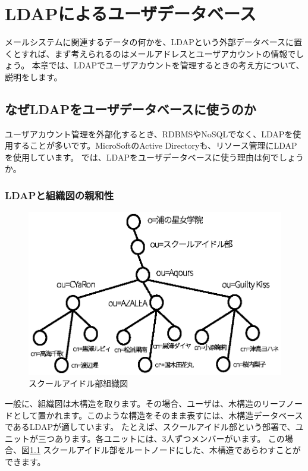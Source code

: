 \chapter{LDAPによるユーザデータベース}

メールシステムに関連するデータの何かを、LDAPという外部データベースに置くとすれば、まず考えられるのはメールアドレスとユーザアカウントの情報でしょう。
本章では、LDAPでユーザアカウントを管理するときの考え方について、説明をします。

\section{なぜLDAPをユーザデータベースに使うのか}

ユーザアカウント管理を外部化するとき、RDBMSやNoSQLでなく、LDAPを使用することが多いです。MicroSoftのActive Directoryも、リソース管理にLDAPを使用しています。
では、LDAPをユーザデータベースに使う理由は何でしょうか。

\subsection{LDAPと組織図の親和性}

\begin{figure}[htbp]
	\includegraphics[width=12cm,clip]{draw/unitmap.eps}
	\caption{スクールアイドル部組織図}
	\label{fig:unitmap}
\end{figure}

一般に、組織図は木構造を取ります。その場合、ユーザは、木構造のリーフノードとして置かれます。このような構造をそのまま表すには、木構造データベースであるLDAPが適しています。
たとえば、スクールアイドル部という部署で、ユニットが三つあります。各ユニットには、3人ずつメンバーがいます。
この場合、図\ref{fig:unitmap} スクールアイドル部をルートノードにした、木構造であらわすことができます。

